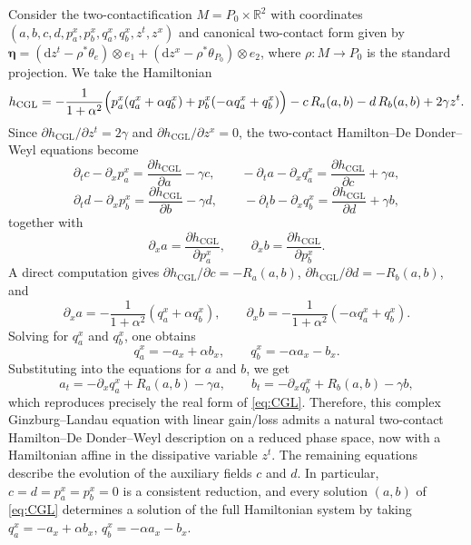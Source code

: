 \documentclass[11pt,a4paper]{article}
\newcommand{\dd}{\mathrm{d}}
\theoremstyle{plain} \newtheorem{theorem}{Theorem}[section] \newtheorem{proposition}[theorem]{Proposition} \newtheorem{corollary}[theorem]{Corollary} \newtheorem{lemma}[theorem]{Lemma} \theoremstyle{definition} \newtheorem{definition}[theorem]{Definition} \theoremstyle{remark} \newtheorem{remark}[theorem]{Remark} \newtheorem{example}[theorem]{Example} %
\begin{document}
Consider the two-contactification \(M=P_0\times\mathbb R^2\) with coordinates \((a,b,c,d,p_a^x,p_b^x,q_a^x,q_b^x,z^t,z^x)\) and canonical two-contact form given by  \(\bm\eta=(\dd z^t-\rho^*\theta_e)\otimes e_1+(\dd z^x-\rho^*\theta_{P_0})\otimes e_2\), where $\rho:M\rightarrow P_0$ is the standard projection. We take the Hamiltonian \[ h_{\mathrm{CGL}} = -\frac{1}{1+\alpha^2}\Bigl(p_a^x(q_a^x+\alpha q_b^x)+p_b^x(-\alpha q_a^x+q_b^x)\Bigr) -c\,R_a(a,b)-d\,R_b(a,b)+2\gamma z^t. \] Since \(\partial h_{\mathrm{CGL}}/\partial z^t=2\gamma\) and \(\partial h_{\mathrm{CGL}}/\partial z^x=0\), the two-contact Hamilton--De Donder--Weyl equations become \[ \partial_t c-\partial_x p_a^x=\frac{\partial h_{\mathrm{CGL}}}{\partial a}-\gamma c,\qquad -\partial_t a-\partial_x q_a^x=\frac{\partial h_{\mathrm{CGL}}}{\partial c}+\gamma a, \] \[ \partial_t d-\partial_x p_b^x=\frac{\partial h_{\mathrm{CGL}}}{\partial b}-\gamma d,\qquad -\partial_t b-\partial_x q_b^x=\frac{\partial h_{\mathrm{CGL}}}{\partial d}+\gamma b, \] together with \[ \partial_x a=\frac{\partial h_{\mathrm{CGL}}}{\partial p_a^x},\qquad \partial_x b=\frac{\partial h_{\mathrm{CGL}}}{\partial p_b^x}. \] A direct computation gives \(\partial h_{\mathrm{CGL}}/\partial c=-R_a(a,b)\), \(\partial h_{\mathrm{CGL}}/\partial d=-R_b(a,b)\), and \[ \partial_x a=-\frac{1}{1+\alpha^2}(q_a^x+\alpha q_b^x),\qquad \partial_x b=-\frac{1}{1+\alpha^2}(-\alpha q_a^x+q_b^x). \] Solving for \(q_a^x\) and \(q_b^x\), one obtains \[ q_a^x=-a_x+\alpha b_x,\qquad q_b^x=-\alpha a_x-b_x. \] Substituting into the equations for \(a\) and \(b\), we get \[ a_t=-\partial_x q_a^x+R_a(a,b)-\gamma a,\qquad b_t=-\partial_x q_b^x+R_b(a,b)-\gamma b, \] which reproduces precisely the real form of \eqref{eq:CGL}. Therefore, this complex Ginzburg--Landau equation with linear gain/loss admits a natural two-contact Hamilton--De Donder--Weyl description on a reduced phase space, now with a Hamiltonian affine in the dissipative variable \(z^t\). The remaining equations describe the evolution of the auxiliary fields \(c\) and \(d\). In particular, \(c=d=p_a^x=p_b^x=0\) is a consistent reduction, and every solution \((a,b)\) of \eqref{eq:CGL} determines a solution of the full Hamiltonian system by taking \(q_a^x=-a_x+\alpha b_x\), \(q_b^x=-\alpha a_x-b_x\).


 

\end{document}
